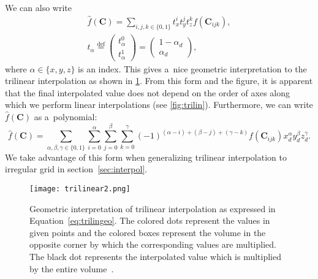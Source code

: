 				\noindent We can also write
					\begin{eqnarray}
						\label{eq:trilingeo}
						\widehat{f}(\mathbf{C}) = \sum_{i,j,k \in \{0,1\}} t_x^i t_y^j t_z^k f(\mathbf{C}_{ijk}),\\
						t_\alpha \stackrel{\text{def}}{=} \begin{pmatrix}t_\alpha^0\\ t_\alpha^1\end{pmatrix} = \begin{pmatrix}1-\alpha_d\\ \alpha_d\end{pmatrix},
					\end{eqnarray}
				where $\alpha \in \{x,y,z\}$ is an index. This gives a~nice geometric interpretation to the trilinear interpolation as shown in \cref{fig:trilin2}. From this form and the figure, it is apparent that the final interpolated value does not depend on the order of axes along which we perform linear interpolations (see \cref{fig:trilin}). Furthermore, we can write $\widehat{f}(\mathbf{C})$ as a~polynomial:
					\begin{equation}
						\label{eq:trilinpoly}
						\widehat{f}(\mathbf{C}) = \sum_{\alpha,\beta,\gamma \in \{0,1\}}\sum^{\alpha}_{i=0}\sum^{\beta}_{j=0}\sum^{\gamma}_{k=0} 	(-1)^{(\alpha-i)+(\beta-j)+(\gamma-k)} f(\mathbf{C}_{ijk}) x_d^\alpha y_d^\beta z_d^\gamma.
					\end{equation}
				We take advantage of this form when generalizing trilinear interpolation to irregular grid in section~\ref{sec:interpol}.
					
				\begin{figure}
					\centering
					\texttt{[image: trilinear2.png]}
					\caption{Geometric interpretation of trilinear interpolation as expressed in Equation~\ref{eq:trilingeo}. The colored dots represent the values in given points and the colored boxes represent the volume in the opposite corner by which the corresponding values are multiplied. The black dot represents the interpolated value which is multiplied by the entire volume~\cite{trilinear}.}
					\label{fig:trilin2}
				\end{figure}
				
